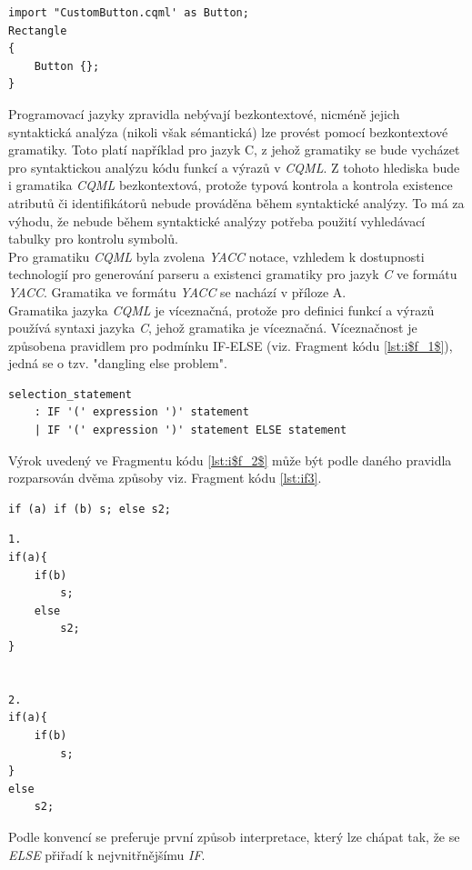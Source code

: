 \documentclass[11pt,twoside,a4paper]{book}
\begin{document}
{{\begin{ttemize}
{{\begin{lstlisting}[frame=single,caption=Ukázka importu komponenty v jazyce \textit{CQML}.,label=lst:cqml2]
import "CustomButton.cqml' as Button;
Rectangle
{
	Button {};
}
\end{lstlisting}
Programovací jazyky zpravidla nebývají bezkontextové, nicméně jejich syntaktická analýza (nikoli však sémantická) lze provést pomocí bezkontextové gramatiky. Toto platí například pro jazyk C, z jehož gramatiky se bude vycházet pro syntaktickou analýzu kódu funkcí a výrazů v \textit{CQML}. Z tohoto hlediska bude i gramatika \textit{CQML} bezkontextová, protože typová kontrola a kontrola existence atributů či identifikátorů nebude prováděna během syntaktické analýzy. To má za výhodu, že nebude během syntaktické analýzy potřeba použití vyhledávací tabulky pro kontrolu symbolů.\\
Pro gramatiku \textit{CQML} byla zvolena \textit{YACC} notace, vzhledem k dostupnosti technologií pro generování parseru a existenci gramatiky pro jazyk \textit{C} ve formátu \textit{YACC}. Gramatika ve formátu \textit{YACC} se nachází v příloze A.\\
Gramatika jazyka \textit{CQML} je víceznačná, protože pro definici funkcí a výrazů používá syntaxi jazyka \textit{C}, jehož gramatika je víceznačná. Víceznačnost je způsobena pravidlem pro podmínku IF-ELSE (viz. Fragment kódu \ref{lst:i$f_1$}), jedná se o tzv. "dangling else problem".\\
\begin{lstlisting}[frame=single,caption=Víceznačné IF-ELSE pravidlo gramatiky.,label=lst:i$f_1$]
selection_statement
	: IF '(' expression ')' statement
	| IF '(' expression ')' statement ELSE statement 
\end{lstlisting}
Výrok uvedený ve Fragmentu kódu \ref{lst:i$f_2$} může být podle daného pravidla rozparsován dvěma způsoby viz. Fragment kódu \ref{lst:if3}.
\begin{lstlisting}[frame=single,caption=Příklad víceznačného výroku \textit{IF}-\textit{ELSE},label=lst:i$f_2$]
if (a) if (b) s; else s2;
\end{lstlisting}

\begin{lstlisting}[frame=single,caption=Možnosti interpretace víceznačného výroku IF-ELSE,label=lst:if3]
1.
if(a){
	if(b)
		s;
	else
		s2;
}


2.
if(a){
	if(b)
		s;
}
else
	s2;
\end{lstlisting}
Podle konvencí se preferuje první způsob interpretace, který lze chápat tak, že se \textit{ELSE} přiřadí k nejvnitřnějšímu \textit{IF}.


}}
\end{ttemize}}}
\end{document}
